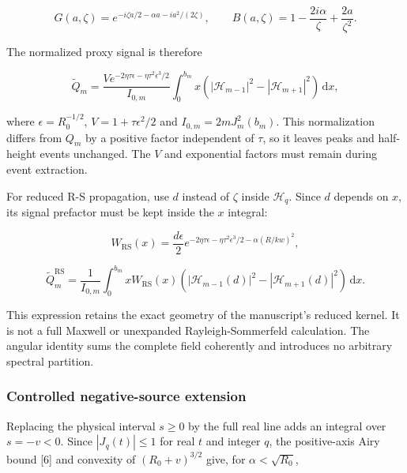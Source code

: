 \begin{equation}G(a,\zeta)=e^{-i\zeta a/2-\alpha a-ia^2/(2\zeta)},\qquad B(a,\zeta)=1-\frac{2i\alpha}{\zeta}+\frac{2a}{\zeta^2}.\end{equation}

The normalized proxy signal is therefore

\begin{equation}\widetilde Q_m=\frac{V e^{-2\eta\tau\epsilon-\eta\tau^2\epsilon^3/2}}{I_{0,m}}\int_0^{b_m}x\left(|\mathcal H_{m-1}|^2-|\mathcal H_{m+1}|^2\right)\,\mathrm{d}x,\end{equation}

where \(\epsilon=R_0^{-1/2}\), \(V=1+\tau\epsilon^2/2\) and
\(I_{0,m}=2mJ_m^2(b_m)\). This normalization differs from \(Q_m\) by a
positive factor independent of \(\tau\), so it leaves peaks and
half-height events unchanged. The \(V\) and exponential factors must
remain during event extraction.

For reduced R-S propagation, use \(d\) instead of \(\zeta\) inside
\(\mathcal H_q\). Since \(d\) depends on \(x\), its signal prefactor
must be kept inside the \(x\) integral:

\begin{equation}W_{\mathrm{RS}}(x)=\frac{d\epsilon}{2}e^{-2\eta\tau\epsilon-\eta\tau^2\epsilon^3/2-\alpha(R/kw)^2},\end{equation}

\begin{equation}\widetilde Q_m^{\mathrm{RS}}=\frac{1}{I_{0,m}}\int_0^{b_m}xW_{\mathrm{RS}}(x)\left(|\mathcal H_{m-1}(d)|^2-|\mathcal H_{m+1}(d)|^2\right)\,\mathrm{d}x.\end{equation}

This expression retains the exact geometry of the manuscript's reduced
kernel. It is not a full Maxwell or unexpanded Rayleigh-Sommerfeld
calculation. The angular identity sums the complete field coherently and
introduces no arbitrary spectral partition.

\subsubsection*{Controlled negative-source
extension}\label{controlled-negative-source-extension}

Replacing the physical interval \(s\geq0\) by the full real line adds an
integral over \(s=-v<0\). Since \(|J_q(t)|\leq1\) for real \(t\) and
integer \(q\), the positive-axis Airy bound {[}6{]} and convexity of
\((R_0+v)^{3/2}\) give, for \(\alpha<\sqrt{R_0}\),

